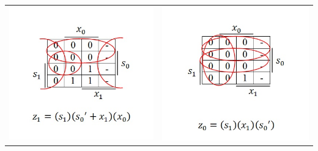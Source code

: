 \documentclass{article}
\begin{document}
\begin{table}[h!]
\begin{tabular}{ c c }
\centering
\includegraphics[scale=0.6]{z1-KMap} &
\includegraphics[scale=0.6]{z0-KMap} \\
\end{tabular}
\end{table}

\pagebreak
\end{document}
